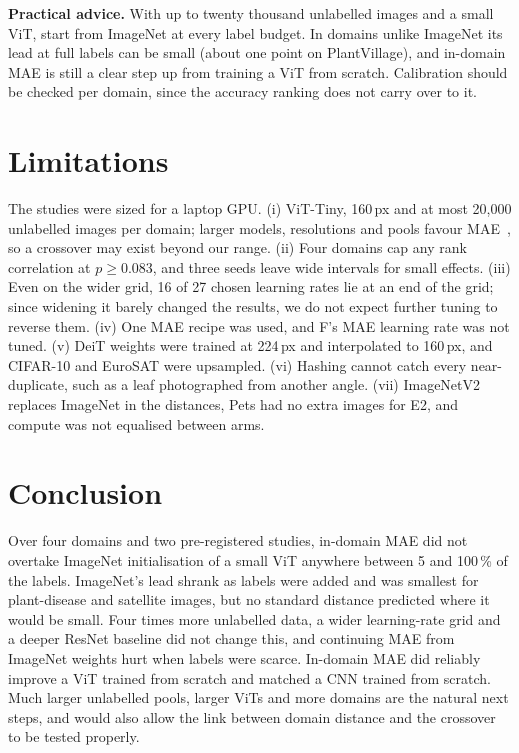 \documentclass[conference]{IEEEtran}
\begin{document}
\textbf{Practical advice.} With up to twenty thousand unlabelled images and a small ViT, start from ImageNet at
every label budget. In domains unlike ImageNet its lead at full labels can be small (about one point on
PlantVillage), and in-domain MAE is still a clear step up from training a ViT from scratch. Calibration should be
checked per domain, since the accuracy ranking does not carry over to it.

\section{Limitations}
The studies were sized for a laptop GPU. (i) ViT-Tiny, 160\,px and at most 20,000 unlabelled images per domain;
larger models, resolutions and pools favour MAE~\cite{he2022mae}, so a crossover may exist beyond our range. (ii)
Four domains cap any rank correlation at $p \geq 0.083$, and three seeds leave wide intervals for small effects.
(iii) Even on the wider grid, 16 of 27 chosen learning rates lie at an end of the grid; since widening it barely
changed the results, we do not expect further tuning to reverse them. (iv) One MAE recipe was used, and F's MAE
learning rate was not tuned. (v) DeiT weights were trained at 224\,px and interpolated to 160\,px, and CIFAR-10 and
EuroSAT were upsampled. (vi) Hashing cannot catch every near-duplicate, such as a leaf photographed from another
angle. (vii) ImageNetV2 replaces ImageNet in the distances, Pets had no extra images for E2, and compute was not
equalised between arms.

\section{Conclusion}
Over four domains and two pre-registered studies, in-domain MAE did not overtake ImageNet initialisation of a small
ViT anywhere between 5 and 100\,\% of the labels. ImageNet's lead shrank as labels were added and was smallest for
plant-disease and satellite images, but no standard distance predicted where it would be small. Four times more
unlabelled data, a wider learning-rate grid and a deeper ResNet baseline did not change this, and continuing MAE
from ImageNet weights hurt when labels were scarce. In-domain MAE did reliably improve a ViT trained from scratch
and matched a CNN trained from scratch. Much larger unlabelled pools, larger ViTs and more domains are the natural
next steps, and would also allow the link between domain distance and the crossover to be tested properly.
\end{document}
